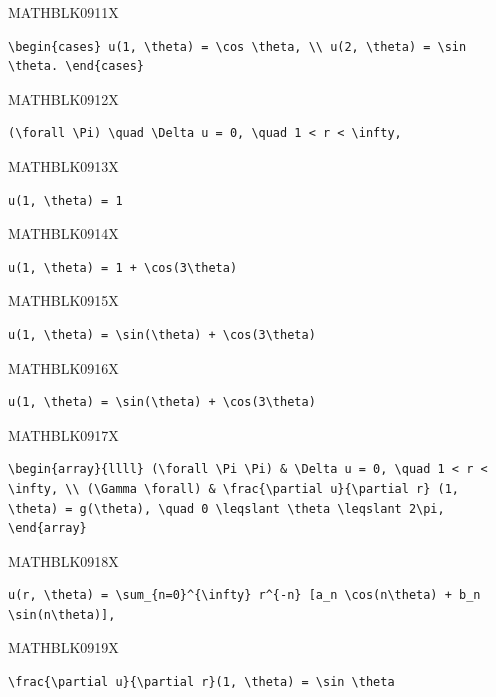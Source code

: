 \documentclass[
  ukrainian,
]{article}
\begin{document}
MATHBLK0911X

\begin{verbatim}
\begin{cases} u(1, \theta) = \cos \theta, \\ u(2, \theta) = \sin \theta. \end{cases}
\end{verbatim}

MATHBLK0912X

\begin{verbatim}
(\forall \Pi) \quad \Delta u = 0, \quad 1 < r < \infty,
\end{verbatim}

MATHBLK0913X

\begin{verbatim}
u(1, \theta) = 1
\end{verbatim}

MATHBLK0914X

\begin{verbatim}
u(1, \theta) = 1 + \cos(3\theta)
\end{verbatim}

MATHBLK0915X

\begin{verbatim}
u(1, \theta) = \sin(\theta) + \cos(3\theta)
\end{verbatim}

MATHBLK0916X

\begin{verbatim}
u(1, \theta) = \sin(\theta) + \cos(3\theta)
\end{verbatim}

MATHBLK0917X

\begin{verbatim}
\begin{array}{llll} (\forall \Pi \Pi) & \Delta u = 0, \quad 1 < r < \infty, \\ (\Gamma \forall) & \frac{\partial u}{\partial r} (1, \theta) = g(\theta), \quad 0 \leqslant \theta \leqslant 2\pi, \end{array}
\end{verbatim}

MATHBLK0918X

\begin{verbatim}
u(r, \theta) = \sum_{n=0}^{\infty} r^{-n} [a_n \cos(n\theta) + b_n \sin(n\theta)],
\end{verbatim}

MATHBLK0919X

\begin{verbatim}
\frac{\partial u}{\partial r}(1, \theta) = \sin \theta
\end{verbatim}
\end{document}
